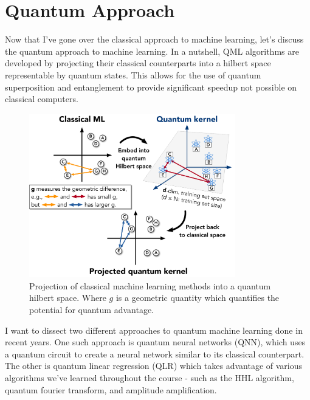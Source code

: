 \documentclass[12pt]{article}
\begin{document}
\begin{itemize}
\end{itemize}

\section*{Quantum Approach}
Now that I've gone over the classical approach to machine learning, let's discuss the quantum approach to machine learning. In a nutshell, QML algorithms are developed by projecting their classical counterparts into a hilbert space representable by quantum states. This allows for the use of quantum superposition and entanglement to provide significant speedup not possible on classical computers.

\begin{figure}[h]
\centering
\includegraphics[width=0.8\textwidth]{QuantumKernel.png}
\caption{Projection of classical machine learning methods into a quantum hilbert space. Where $g$ is a geometric quantity which quantifies the potential for quantum advantage.}
\end{figure}

I want to dissect two different approaches to quantum machine learning done in recent years. One such approach is quantum neural networks (QNN), which uses a quantum circuit to create a neural network similar to its classical counterpart. The other is quantum linear regression (QLR) which takes advantage of various algorithms we've learned throughout the course - such as the HHL algorithm, quantum fourier transform, and amplitude amplification.
\end{document}
